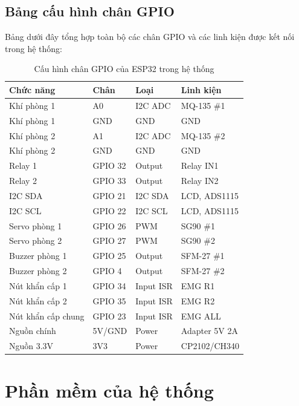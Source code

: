 \documentclass[../BTL_PTIT.tex]{subfiles}
\begin{document}
\subsection{Bảng cấu hình chân GPIO}
Bảng dưới đây tổng hợp toàn bộ các chân GPIO và các linh kiện được kết nối trong hệ thống:
\begin{table}[H]
\centering
\caption{Cấu hình chân GPIO của ESP32 trong hệ thống}
\label{tab:esp32_gpio_config}
\begin{tabular}{|l|l|l|l|}
\hline
\textbf{Chức năng} & \textbf{Chân} & \textbf{Loại} & \textbf{Linh kiện} \\
\hline
Khí phòng 1 & A0 & I2C ADC & MQ-135 \#1 \\
Khí phòng 1 & GND & GND & GND \\
Khí phòng 2 & A1 & I2C ADC & MQ-135 \#2 \\
Khí phòng 2 & GND & GND & GND \\
Relay 1 & GPIO 32 & Output & Relay IN1 \\
Relay 2 & GPIO 33 & Output & Relay IN2 \\
I2C SDA & GPIO 21 & I2C SDA & LCD, ADS1115 \\
I2C SCL & GPIO 22 & I2C SCL & LCD, ADS1115 \\
Servo phòng 1 & GPIO 26 & PWM & SG90 \#1 \\
Servo phòng 2 & GPIO 27 & PWM & SG90 \#2 \\
Buzzer phòng 1 & GPIO 25 & Output & SFM-27 \#1 \\
Buzzer phòng 2 & GPIO 4 & Output & SFM-27 \#2 \\
Nút khẩn cấp 1 & GPIO 34 & Input ISR & EMG R1 \\
Nút khẩn cấp 2 & GPIO 35 & Input ISR & EMG R2 \\
Nút khẩn cấp chung & GPIO 23 & Input ISR & EMG ALL \\
Nguồn chính & 5V/GND & Power & Adapter 5V 2A \\
Nguồn 3.3V & 3V3 & Power & CP2102/CH340 \\
\hline
\end{tabular}
\end{table}

\section{Phần mềm của hệ thống}
\end{document}
